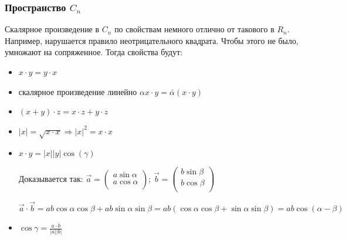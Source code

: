 \documentclass{article}
\begin{document}
\subsubsection*{Пространство $C_n$}

Скалярное произведение в $C_n$ по свойствам немного отлично от такового в $R_n$. Например, нарушается правило неотрицательного квадрата. Чтобы этого не было, умножают на сопряженное. Тогда свойства будут:

\begin{itemize}
\item $x\cdot y = y\cdot x$
\item скалярное произведение линейно $\alpha x\cdot y = \bar \alpha(x\cdot y)$
\item $(x+y)\cdot z = x\cdot z + y\cdot z$
\item $|x| = \sqrt{x\cdot x} \Rightarrow |x|^2 = x\cdot x$
\item $x\cdot y = |x||y|\cos(\gamma)$

Доказывается так:
$\vec a = \begin{pmatrix}
	a\sin\alpha\\
	a\cos\alpha\\
\end{pmatrix}$;
$\vec b = \begin{pmatrix}
	b\sin\beta\\
	b\cos\beta\\
\end{pmatrix}$

$\vec a\cdot \vec b = ab\cos\alpha \cos\beta + ab\sin\alpha\sin\beta = ab(\cos\alpha \cos\beta +\sin\alpha\sin\beta) =ab\cos(\alpha-\beta)$

\item $\cos \gamma = \frac{a\cdot b}{|a||b|}$

\end{itemize}
\end{document}
